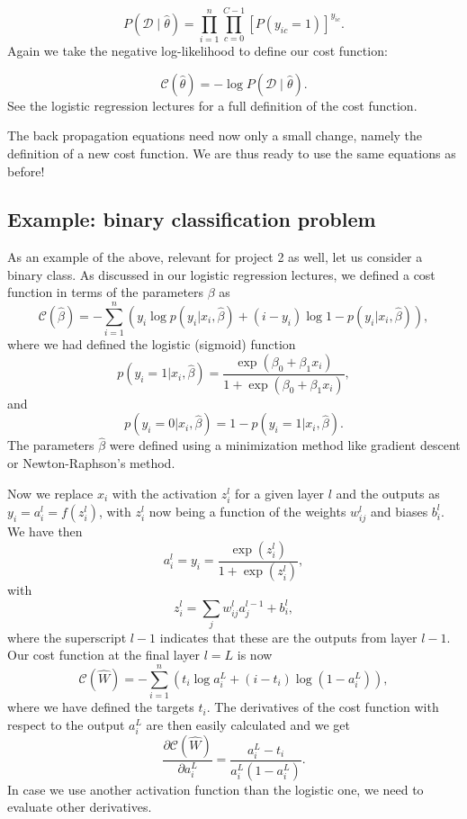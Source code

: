 \documentclass[%
oneside,                 %
final,                   %
10pt]{article}
\begin{document}
\[
P(\mathcal{D} \mid \hat{\theta}) = \prod_{i=1}^n \prod_{c=0}^{C-1} [P(y_{ic} = 1)]^{y_{ic}} .
\]
Again we take the negative log-likelihood to define our cost function:  

\[
\mathcal{C}(\hat{\theta}) = - \log{P(\mathcal{D} \mid \hat{\theta})}.
\]
See the logistic regression lectures for a full definition of the cost function.

The back propagation equations need now only a small change, namely the definition of a new cost function. We are thus ready to use the same equations as before!

\subsection{Example: binary classification problem}

As an example of the above, relevant for project 2 as well, let us consider a binary class. As discussed in our logistic regression lectures, we defined a cost function in terms of the parameters $\beta$ as
\[
\mathcal{C}(\hat{\beta}) = - \sum_{i=1}^n \left(y_i\log{p(y_i \vert x_i,\hat{\beta})}+(i-y_i)\log{1-p(y_i \vert x_i,\hat{\beta})}\right),
\]
where we had defined the logistic (sigmoid) function
\[
p(y_i =1\vert x_i,\hat{\beta})=\frac{\exp{(\beta_0+\beta_1 x_i)}}{1+\exp{(\beta_0+\beta_1 x_i)}},
\]
and
\[
p(y_i =0\vert x_i,\hat{\beta})=1-p(y_i =1\vert x_i,\hat{\beta}).
\]
The parameters $\hat{\beta}$ were defined using a minimization method like gradient descent or Newton-Raphson's method. 

Now we replace $x_i$ with the activation $z_i^l$ for a given layer $l$ and the outputs as $y_i=a_i^l=f(z_i^l)$, with $z_i^l$ now being a function of the weights $w_{ij}^l$ and biases $b_i^l$. 
We have then
\[
a_i^l = y_i = \frac{\exp{(z_i^l)}}{1+\exp{(z_i^l)}},
\]
with 
\[
z_i^l = \sum_{j}w_{ij}^l a_j^{l-1}+b_i^l,
\]
where the superscript $l-1$ indicates that these are the outputs from layer $l-1$.
Our cost function at the final layer $l=L$ is now
\[
\mathcal{C}(\hat{W}) = - \sum_{i=1}^n \left(t_i\log{a_i^L}+(i-t_i)\log{(1-a_i^L)}\right),
\]
where we have defined the targets $t_i$. The derivatives of the cost function with respect to the output $a_i^L$ are then easily calculated and we get
\[
\frac{\partial \mathcal{C}(\hat{W})}{\partial a_i^L} = \frac{a_i^L-t_i}{a_i^L(1-a_i^L)}. 
\]
In case we use another activation function than the logistic one, we need to evaluate other derivatives. 


\end{document}
